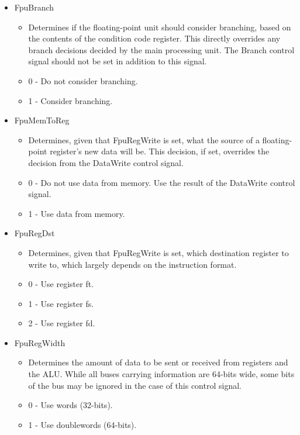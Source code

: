 \documentclass[
    paper=letter,
    parskip=half,
    fontsize=12pt,
    titlepage=firstiscover,
    toc=bibliography,
    numbers=endperiod
]{scrartcl}
\providecommand{\tightlist}{%
  \setlength{\itemsep}{0pt}\setlength{\parskip}{0pt}}
\begin{document}
\begin{itemize}
    \item FpuBranch
          \begin{itemize}
              \tightlist
              \item Determines if the floating-point unit should consider branching, based
                    on the contents of the condition code register. This directly overrides
                    any branch decisions decided by the main processing unit. The Branch
                    control signal should not be set in addition to this signal.
              \item 0 - Do not consider branching.
              \item 1 - Consider branching.
          \end{itemize}

    \item FpuMemToReg
          \begin{itemize}
              \tightlist
              \item Determines, given that FpuRegWrite is set, what the source of a
                    floating-point register's new data will be. This decision, if set,
                    overrides the decision from the DataWrite control signal.
              \item 0 - Do not use data from memory. Use the result of the DataWrite
                    control signal.
              \item 1 - Use data from memory.
          \end{itemize}

    \item FpuRegDst
          \begin{itemize}
              \tightlist
              \item Determines, given that FpuRegWrite is set, which destination register to
                    write to, which largely depends on the instruction format.
              \item 0 - Use register ft.
              \item 1 - Use register fs.
              \item 2 - Use register fd.
          \end{itemize}

    \item FpuRegWidth
          \begin{itemize}
              \tightlist
              \item Determines the amount of data to be sent or received from registers and
                    the ALU. While all buses carrying information are 64-bits wide, some
                    bits of the bus may be ignored in the case of this control signal.
              \item 0 - Use words (32-bits).
              \item 1 - Use doublewords (64-bits).
          \end{itemize}


\end{itemize}
\end{document}

